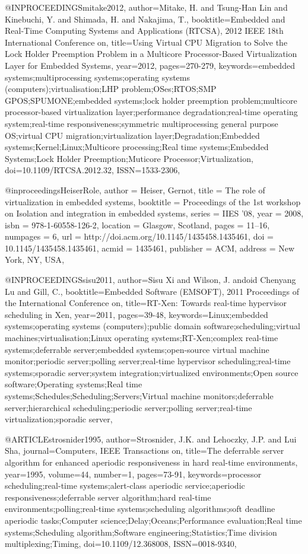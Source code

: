 @INPROCEEDINGS{mitake2012, 
author={Mitake, H. and Tsung-Han Lin and Kinebuchi, Y. and Shimada, H. and Nakajima, T.}, 
booktitle={Embedded and Real-Time Computing Systems and Applications (RTCSA), 2012 IEEE 18th International Conference on}, 
title={Using Virtual CPU Migration to Solve the Lock Holder Preemption Problem in a Multicore Processor-Based Virtualization Layer for Embedded Systems}, 
year={2012}, 
pages={270-279}, 
keywords={embedded systems;multiprocessing systems;operating systems (computers);virtualisation;LHP problem;OSes;RTOS;SMP GPOS;SPUMONE;embedded systems;lock holder preemption problem;multicore processor-based virtualization layer;performance degradation;real-time operating system;real-time responsiveness;symmetric multiprocessing general purpose OS;virtual CPU migration;virtualization layer;Degradation;Embedded systems;Kernel;Linux;Multicore processing;Real time systems;Embedded Systems;Lock Holder Preemption;Muticore Processor;Virtualization}, 
doi={10.1109/RTCSA.2012.32}, 
ISSN={1533-2306},}

@inproceedings{HeiserRole,
 author = {Heiser, Gernot},
 title = {The role of virtualization in embedded systems},
 booktitle = {Proceedings of the 1st workshop on Isolation and integration in embedded systems},
 series = {IIES '08},
 year = {2008},
 isbn = {978-1-60558-126-2},
 location = {Glasgow, Scotland},
 pages = {11--16},
 numpages = {6},
 url = {http://doi.acm.org/10.1145/1435458.1435461},
 doi = {10.1145/1435458.1435461},
 acmid = {1435461},
 publisher = {ACM},
 address = {New York, NY, USA},
}

@INPROCEEDINGS{sisu2011, 
author={Sisu Xi and Wilson, J. andoid Chenyang Lu and Gill, C.}, 
booktitle={Embedded Software (EMSOFT), 2011 Proceedings of the International Conference on}, 
title={RT-Xen: Towards real-time hypervisor scheduling in Xen}, 
year={2011}, 
pages={39-48}, 
keywords={Linux;embedded systems;operating systems (computers);public domain software;scheduling;virtual machines;virtualisation;Linux operating systems;RT-Xen;complex real-time systems;deferrable server;embedded systems;open-source virtual machine monitor;periodic server;polling server;real-time hypervisor scheduling;real-time systems;sporadic server;system integration;virtualized environments;Open source software;Operating systems;Real time systems;Schedules;Scheduling;Servers;Virtual machine monitors;deferrable server;hierarchical scheduling;periodic server;polling server;real-time virtualization;sporadic server},}

@ARTICLE{strosnider1995, 
author={Strosnider, J.K. and Lehoczky, J.P. and Lui Sha}, 
journal={Computers, IEEE Transactions on}, 
title={The deferrable server algorithm for enhanced aperiodic responsiveness in hard real-time environments}, 
year={1995}, 
volume={44}, 
number={1}, 
pages={73-91}, 
keywords={processor scheduling;real-time systems;alert-class aperiodic service;aperiodic responsiveness;deferrable server algorithm;hard real-time environments;polling;real-time systems;scheduling algorithms;soft deadline aperiodic tasks;Computer science;Delay;Oceans;Performance evaluation;Real time systems;Scheduling algorithm;Software engineering;Statistics;Time division multiplexing;Timing}, 
doi={10.1109/12.368008}, 
ISSN={0018-9340},}

